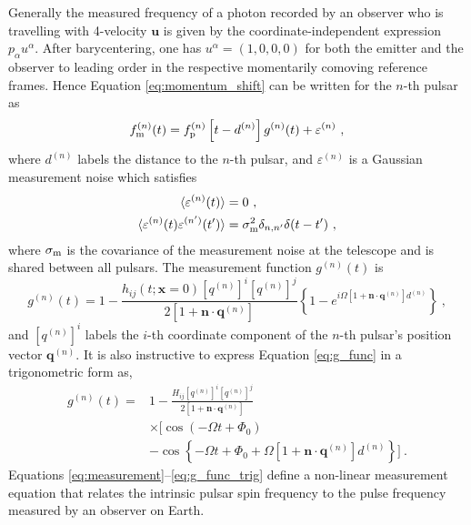 \documentclass[fleqn,usenatbib,useAMS]{mnras}
\begin{document}
Generally the measured frequency of a photon recorded by an observer who is travelling with 4-velocity $\boldsymbol{u}$ is given by the coordinate-independent expression $p_{\alpha} u^{\alpha}$. After barycentering, one has $u^{\alpha} =(1,0,0,0)$ for both the emitter and the observer to leading order in the respective momentarily comoving reference frames. Hence Equation \eqref{eq:momentum_shift} can be written for the $n$-th pulsar as
\begin{equation}
	f_{\rm m}^{(n)}(t) = f_{\rm p}^{(n)}\left [t-d^{(n)} \right ] g^{(n)}(t) +  \varepsilon^{(n)}\ ,
	\label{eq:measurement}
\end{equation}
where $d^{(n)}$ labels the distance to the $n$-th pulsar, and $\varepsilon^{(n)}$ is a Gaussian measurement noise which satisfies 
\begin{align}
	\langle \varepsilon^{(n)}(t) \rangle &= 0 \ , \\
	\langle \varepsilon^{(n)}(t) \varepsilon^{(n')}(t') \rangle &= \sigma_{\rm m}^2 \delta_{n,n'} \delta(t - t') \ ,	\label{eq:vareps}
\end{align}
where $\sigma_{\rm m}$ is the covariance of the measurement noise at the telescope and is shared between all pulsars. The measurement function $g^{(n)}(t)$ is
\begin{equation}
	g^{(n)}(t) = 1 - \frac{h_{ij} (t; \boldsymbol{x}= 0)[q^{(n)}]^i [q^{(n)}]^j}{2[1 + \boldsymbol{n}\cdot \boldsymbol{q}^{(n)}] }  \left \{1 -e^{i \Omega \left[1 + \boldsymbol{n}\cdot \boldsymbol{q}^{(n)} \right]  d^{(n)}}\right \} \ ,
	\label{eq:g_func}
\end{equation}
and $[q^{(n)}]^i$ labels the $i$-th coordinate component of the $n$-th pulsar's position vector $\boldsymbol{q}^{(n)}$. It is also instructive to express Equation \eqref{eq:g_func} in a trigonometric form as,
\begin{align}
	g^{(n)}(t) =& 1 - \frac{ H_{ij}[q^{(n)}]^i [q^{(n)}]^j }{2 [1 + \boldsymbol{n}\cdot \boldsymbol{q}^{(n)}] } \nonumber \\
	& \times \Big[\cos\left(-\Omega t +\Phi_0\right) \nonumber \\
	&- \cos \left \{-\Omega t +\Phi_0 + \Omega \left[1 + \boldsymbol{n}\cdot \boldsymbol{q}^{(n)} \right]  d^{(n)} \right \} \Big ] \ .
	\label{eq:g_func_trig}
\end{align}
Equations \eqref{eq:measurement}--\eqref{eq:g_func_trig}  define a non-linear measurement equation that relates the intrinsic pulsar spin frequency to the pulse frequency measured by an observer on Earth. 
\end{document}

